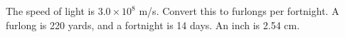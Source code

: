 The speed of light is $3.0\times10^8$  m/s. Convert
this to furlongs per fortnight.  A furlong is 220 yards, and
a fortnight is 14 days.  An inch is 2.54 cm.\answercheck\hwendpart
